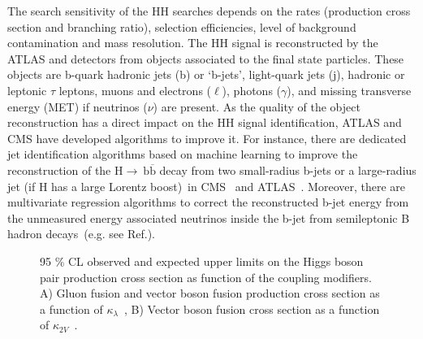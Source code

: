 The search sensitivity of the HH searches depends on the rates (production cross section and branching ratio), selection efficiencies, level of background contamination and mass resolution. The HH signal is reconstructed by the ATLAS and detectors from objects associated to the final state particles. These objects are b-quark hadronic jets (b) or `b-jets', light-quark jets (j), hadronic or leptonic $\tau$ leptons, muons and electrons ($\ell$), photons ($\gamma$), and missing transverse energy (MET) if neutrinos ($\nu$) are present. As the quality of the object reconstruction has a direct impact on the HH signal identification, ATLAS and CMS have developed algorithms to improve it. For instance, there are dedicated jet identification algorithms based on machine learning to improve the reconstruction of the $\mathrm{H\rightarrow~b\overline{b}}$ decay from two small-radius b-jets or a large-radius jet (if H has a large Lorentz boost)~in CMS~\cite{cmsbtag1,cmsbtag2} and ATLAS~\cite{atlasbtag1,atlasbtag2}. Moreover, there are multivariate regression algorithms to correct the reconstructed b-jet energy from the unmeasured energy associated neutrinos inside the b-jet from semileptonic B hadron decays~(e.g. see Ref.\cite{cmsbreg}).

\begin{figure}[ht!]
\centering
\captionsetup[subfigure]{justification=centering}
\caption[95\% CL observed and expected upper limits on the Higgs boson pair production cross section as function of the coupling modifiers]{95 \% CL observed and expected upper limits on the Higgs boson pair production cross section as function of the coupling modifiers. A) Gluon fusion and vector boson fusion production cross section as a function of $\kappa_{\lambda}$~\cite{ATLAS-CONF-2021-052}, B) Vector boson fusion cross section as a function of $\kappa_{2V}$~\cite{cmsrun2boostedbbbb}.}
\label{fig:hhbestresults}
\end{figure}

